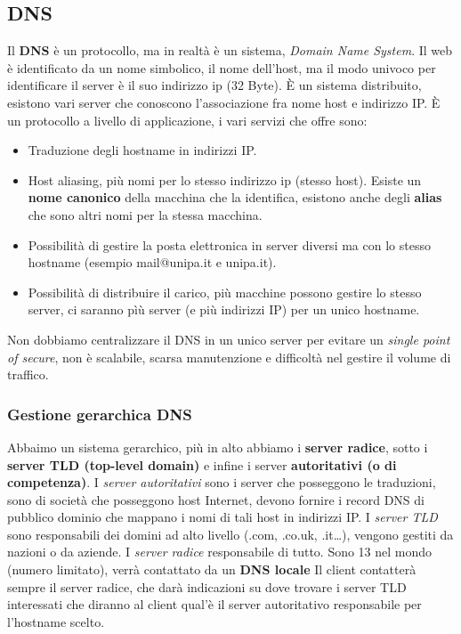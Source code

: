 \subsection{DNS}
Il \textbf{DNS} è un protocollo, ma in realtà è un sistema, \textit{Domain Name System}.
Il web è identificato da un nome simbolico, il nome dell'host, ma il modo univoco per identificare il server è il suo indirizzo ip (32 Byte).
È un sistema distribuito, esistono vari server che conoscono l'associazione fra nome host e indirizzo IP. \newline
È un protocollo a livello di applicazione, i vari servizi che offre sono:
\begin{itemize}
  \item Traduzione degli hostname in indirizzi IP.
  \item Host aliasing, più nomi per lo stesso indirizzo ip (stesso host). Esiste un \textbf{nome canonico} della macchina che la identifica, esistono anche degli \textbf{alias} che sono altri nomi per la stessa macchina.
  \item Possibilità di gestire la posta elettronica in server diversi ma con lo stesso hostname (esempio mail@unipa.it e unipa.it).
  \item Possibilità di distribuire il carico, più macchine possono gestire lo stesso server, ci saranno pìù server (e più indirizzi IP) per un unico hostname.
\end{itemize}

Non dobbiamo centralizzare il DNS in un unico server per evitare un \textit{single point of secure}, non è scalabile, scarsa manutenzione e difficoltà nel gestire il volume di traffico.

\subsubsection{Gestione gerarchica DNS}
Abbaimo un sistema gerarchico, più in alto abbiamo i \textbf{server radice}, sotto i \textbf{server TLD (top-level domain)} e infine i server \textbf{autoritativi (o di competenza)}. \newline
I \textit{server autoritativi} sono i server che posseggono le traduzioni, sono di società che posseggono host Internet, devono fornire i record DNS di pubblico dominio che mappano i nomi di tali host in indirizzi IP. \newline
I \textit{server TLD} sono responsabili dei domini ad alto livello (.com, .co.uk, .it\dots), vengono gestiti da nazioni o da aziende. \newline
I \textit{server radice} responsabile di tutto. Sono 13 nel mondo (numero limitato), verrà contattato da un \textbf{DNS locale} \newline
Il client contatterà sempre il server radice, che darà indicazioni su dove trovare i server TLD interessati che diranno al client qual'è il server autoritativo responsabile per l'hostname scelto.

